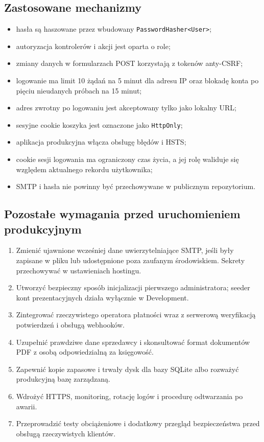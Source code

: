 \documentclass[12pt,a4paper]{article}
\begin{document}
\subsection{Zastosowane mechanizmy}
\begin{itemize}[leftmargin=*]
    \item hasła są haszowane przez wbudowany \texttt{PasswordHasher<User>};
    \item autoryzacja kontrolerów i akcji jest oparta o role;
    \item zmiany danych w formularzach POST korzystają z tokenów anty-CSRF;
    \item logowanie ma limit 10 żądań na 5 minut dla adresu IP oraz blokadę
    konta po pięciu nieudanych próbach na 15 minut;
    \item adres zwrotny po logowaniu jest akceptowany tylko jako lokalny URL;
    \item sesyjne cookie koszyka jest oznaczone jako \texttt{HttpOnly};
    \item aplikacja produkcyjna włącza obsługę błędów i HSTS;
    \item cookie sesji logowania ma ograniczony czas życia, a jej rolę
    waliduje się względem aktualnego rekordu użytkownika;
    \item SMTP i hasła nie powinny być przechowywane w publicznym repozytorium.
\end{itemize}

\subsection{Pozostałe wymagania przed uruchomieniem produkcyjnym}
\begin{enumerate}[leftmargin=*]
    \item Zmienić ujawnione wcześniej dane uwierzytelniające SMTP, jeśli były
    zapisane w pliku lub udostępnione poza zaufanym środowiskiem. Sekrety
    przechowywać w ustawieniach hostingu.
    \item Utworzyć bezpieczny sposób inicjalizacji pierwszego administratora;
    seeder kont prezentacyjnych działa wyłącznie w Development.
    \item Zintegrować rzeczywistego operatora płatności wraz z serwerową
    weryfikacją potwierdzeń i obsługą webhooków.
    \item Uzupełnić prawdziwe dane sprzedawcy i skonsultować format dokumentów
    PDF z osobą odpowiedzialną za księgowość.
    \item Zapewnić kopie zapasowe i trwały dysk dla bazy SQLite albo rozważyć
    produkcyjną bazę zarządzaną.
    \item Wdrożyć HTTPS, monitoring, rotację logów i procedurę odtwarzania
    po awarii.
    \item Przeprowadzić testy obciążeniowe i dodatkowy przegląd bezpieczeństwa
    przed obsługą rzeczywistych klientów.
\end{enumerate}
\end{document}
